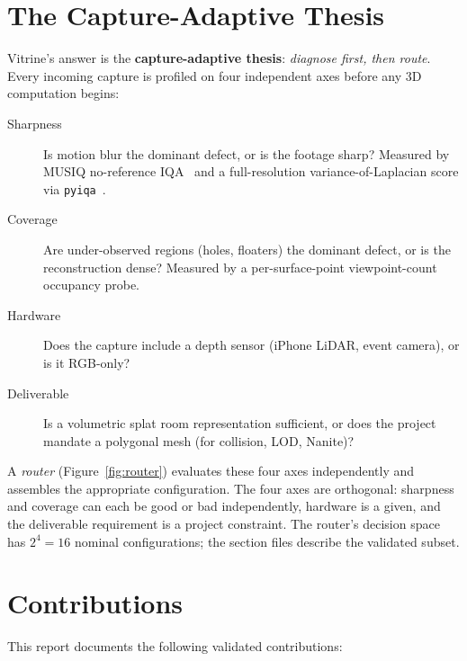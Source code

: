 \documentclass[a4paper,11pt]{report}
\begin{document}
\section{The Capture-Adaptive Thesis}
\label{sec:intro:thesis}

Vitrine's answer is the \textbf{capture-adaptive thesis}: \emph{diagnose first,
then route}.  Every incoming capture is profiled on four independent axes before
any 3D computation begins:

\begin{description}
  \item[Sharpness] Is motion blur the dominant defect, or is the footage sharp?
    Measured by MUSIQ no-reference IQA~\cite{ke2021_musiq} and a full-resolution
    variance-of-Laplacian score via \texttt{pyiqa}~\cite{chen2022_pyiqa}.
  \item[Coverage] Are under-observed regions (holes, floaters) the dominant
    defect, or is the reconstruction dense?  Measured by a per-surface-point
    viewpoint-count occupancy probe.
  \item[Hardware] Does the capture include a depth sensor (iPhone LiDAR, event
    camera), or is it RGB-only?
  \item[Deliverable] Is a volumetric splat room representation sufficient, or does
    the project mandate a polygonal mesh (for collision, LOD, Nanite)?
\end{description}

\noindent A \emph{router} (Figure~\ref{fig:router}) evaluates these four axes
independently and assembles the appropriate configuration.  The four axes are
orthogonal: sharpness and coverage can each be good or bad independently, hardware
is a given, and the deliverable requirement is a project constraint.  The
router's decision space has $2^4 = 16$ nominal configurations; the section
files describe the validated subset.

\section{Contributions}
\label{sec:intro:contributions}

This report documents the following validated contributions:
\end{document}
